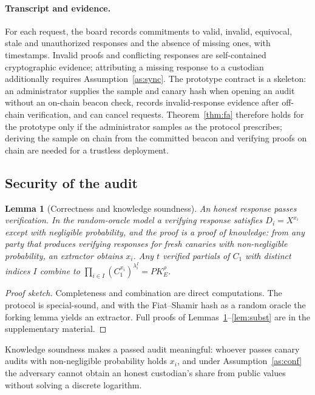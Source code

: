 \documentclass[Crown,sagev]{sagej}
\theoremstyle{plain}
\newtheorem{lemma}{Lemma}
\theoremstyle{definition}
\theoremstyle{remark}
\begin{document}
\paragraph{Transcript and evidence.} For each request, the board records commitments to valid, invalid, equivocal, stale and unauthorized responses and the absence of missing ones, with timestamps. Invalid proofs and conflicting responses are self-contained cryptographic evidence; attributing a missing response to a custodian additionally requires Assumption~\ref{as:sync}. The prototype contract is a skeleton: an administrator supplies the sample and canary hash when opening an audit without an on-chain beacon check, records invalid-response evidence after off-chain verification, and can cancel requests. Theorem~\ref{thm:fa} therefore holds for the prototype only if the administrator samples as the protocol prescribes; deriving the sample on chain from the committed beacon and verifying proofs on chain are needed for a trustless deployment.

\subsection{Security of the audit}

\begin{lemma}[Correctness and knowledge soundness]\label{lem:correct}
An honest response passes verification. In the random-oracle model a verifying response satisfies $D_i=X^{x_i}$ except with negligible probability, and the proof is a proof of knowledge: from any party that produces verifying responses for fresh canaries with non-negligible probability, an extractor obtains $x_i$. Any $t$ verified partials of $C_1$ with distinct indices $I$ combine to $\prod_{i\in I}(C_1^{x_i})^{\lambda_i^I}=PK_E^{\rho}$.
\end{lemma}

\begin{proof}[Proof sketch]
Completeness and combination are direct computations. The protocol is special-sound, and with the Fiat--Shamir hash as a random oracle the forking lemma yields an extractor\cite{chaum1992dleq,fiat1987prove}. Full proofs of Lemmas~\ref{lem:correct}--\ref{lem:subst} are in the supplementary material.
\end{proof}

Knowledge soundness makes a passed audit meaningful: whoever passes canary audits with non-negligible probability holds $x_i$, and under Assumption~\ref{as:conf} the adversary cannot obtain an honest custodian's share from public values without solving a discrete logarithm.
\end{document}
